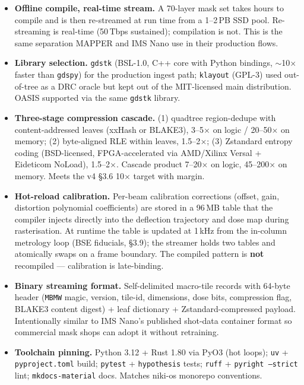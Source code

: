 \documentclass[11pt,letterpaper]{article}
\begin{document}
\begin{itemize}[leftmargin=1.6em]
  \item \textbf{Offline compile, real-time stream.} A 70-layer mask set takes hours to compile and is then re-streamed at run time from a 1--2\,PB SSD pool. Re-streaming is real-time (50\,Tbps sustained); compilation is not. This is the same separation MAPPER and IMS Nano use in their production flows.
  \item \textbf{Library selection.} \texttt{gdstk} (BSL-1.0, C++ core with Python bindings, $\sim$10$\times$ faster than \texttt{gdspy}) for the production ingest path; \texttt{klayout} (GPL-3) used out-of-tree as a DRC oracle but kept out of the MIT-licensed main distribution. OASIS supported via the same \texttt{gdstk} library.
  \item \textbf{Three-stage compression cascade.} (1) quadtree region-dedupe with content-addressed leaves (xxHash or BLAKE3), 3--5$\times$ on logic / 20--50$\times$ on memory; (2) byte-aligned RLE within leaves, 1.5--2$\times$; (3) Zstandard entropy coding (BSD-licensed, FPGA-accelerated via AMD/Xilinx Versal + Eideticom NoLoad), 1.5--2$\times$. Cascade product 7--20$\times$ on logic, 45--200$\times$ on memory. Meets the v4 \S 3.6 10$\times$ target with margin.
  \item \textbf{Hot-reload calibration.} Per-beam calibration corrections (offset, gain, distortion polynomial coefficients) are stored in a 96\,MB table that the compiler injects directly into the deflection trajectory and dose map during rasterisation. At runtime the table is updated at 1\,kHz from the in-column metrology loop (BSE fiducials, \S 3.9); the streamer holds two tables and atomically swaps on a frame boundary. The compiled pattern is \textbf{not} recompiled --- calibration is late-binding.
  \item \textbf{Binary streaming format.} Self-delimited macro-tile records with 64-byte header (\texttt{MBMW} magic, version, tile-id, dimensions, dose bits, compression flag, BLAKE3 content digest) + leaf dictionary + Zstandard-compressed payload. Intentionally similar to IMS Nano's published shot-data container format so commercial mask shops can adopt it without retraining.
  \item \textbf{Toolchain pinning.} Python 3.12 + Rust 1.80 via PyO3 (hot loops); \texttt{uv} + \texttt{pyproject.toml} build; \texttt{pytest} + \texttt{hypothesis} tests; \texttt{ruff} + \texttt{pyright --strict} lint; \texttt{mkdocs-material} docs. Matches niki-os monorepo conventions.
\end{itemize}
\end{document}
